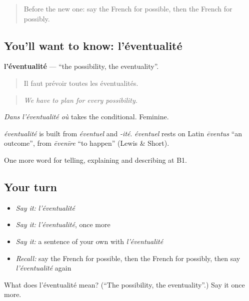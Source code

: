 \begin{quote}
Before the new one: say the French for possible, then the French for possibly.
\end{quote}

\subsection*{You'll want to know: l'éventualité}
\textbf{l'éventualité} — \textquotedblleft{}the possibility, the eventuality\textquotedblright{}.

\begin{quote}
Il faut prévoir toutes les éventualités.
\end{quote}

\begin{quote}
\emph{We have to plan for every possibility.}
\end{quote}

\emph{Dans l'éventualité où} takes the conditional. Feminine.

\begin{cousinweb}
\emph{éventualité} is built from \emph{éventuel} and \emph{-ité}. \emph{éventuel} rests on Latin \emph{ēventus} \textquotedblleft{}an outcome\textquotedblright{}, from \emph{ēvenīre} \textquotedblleft{}to happen\textquotedblright{} (Lewis \& Short).
\end{cousinweb}

\begin{grammarlens}[title={What you've built}]
One more word for telling, explaining and describing at B1.
\end{grammarlens}

\subsection*{Your turn}
\begin{itemize}
\raggedright
  \item \emph{Say it:} \emph{l'éventualité}
  \item \emph{Say it:} \emph{l'éventualité}, once more
  \item \emph{Say it:} a sentence of your own with \emph{l'éventualité}
  \item \emph{Recall:} say the French for possible, then the French for possibly, then say \emph{l'éventualité} again
\end{itemize}

\begin{tcolorbox}[breakable,colback=teal!4,colframe=teal!35!black,title={Before you move on}]
What does l'éventualité mean? (\textquotedblleft{}The possibility, the eventuality\textquotedblright{}.) Say it once more.
\end{tcolorbox}

